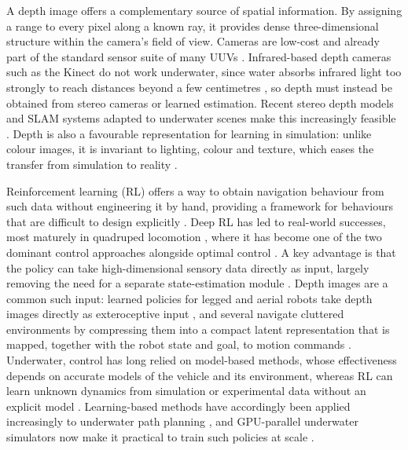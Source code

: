 A depth image offers a complementary source of spatial information. By assigning a range to every pixel along a known ray, it provides dense three-dimensional structure within the camera's field of view. Cameras are low-cost and already part of the standard sensor suite of many UUVs \parencite{haugalokken2024lowcost}. Infrared-based depth cameras such as the Kinect do not work underwater, since water absorbs infrared light too strongly to reach distances beyond a few centimetres \parencite{massotcampos2015optical}, so depth must instead be obtained from stereo cameras or learned estimation. Recent stereo depth models and SLAM systems adapted to underwater scenes make this increasingly feasible \parencite{wu2025stereoadapter, surfslam}. Depth is also a favourable representation for learning in simulation: unlike colour images, it is invariant to lighting, colour and texture, which eases the transfer from simulation to reality \parencite{patel2026defm}.

Reinforcement learning (RL) offers a way to obtain navigation behaviour from such data without engineering it by hand, providing a framework for behaviours that are difficult to design explicitly \parencite{kober2013reinforcement}. Deep RL has led to real-world successes, most maturely in quadruped locomotion \parencite{tang2025deep}, where it has become one of the two dominant control approaches alongside optimal control \parencite{ha2025learning}. A key advantage is that the policy can take high-dimensional sensory data directly as input, largely removing the need for a separate state-estimation module \parencite{ha2025learning}. Depth images are a common such input: learned policies for legged and aerial robots take depth images directly as exteroceptive input \parencite{ha2025learning}, and several navigate cluttered environments by compressing them into a compact latent representation that is mapped, together with the robot state and goal, to motion commands \parencite{kulkarni2024dce, hoeller2021learning}. Underwater, control has long relied on model-based methods, whose effectiveness depends on accurate models of the vehicle and its environment, whereas RL can learn unknown dynamics from simulation or experimental data without an explicit model \parencite{hong2025control}. Learning-based methods have accordingly been applied increasingly to underwater path planning \parencite{an2023intelligent}, and GPU-parallel underwater simulators now make it practical to train such policies at scale \parencite{chu2025marinegym}.

